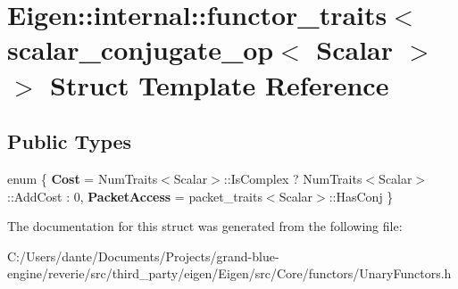 \hypertarget{struct_eigen_1_1internal_1_1functor__traits_3_01scalar__conjugate__op_3_01_scalar_01_4_01_4}{}\section{Eigen\+::internal\+::functor\+\_\+traits$<$ scalar\+\_\+conjugate\+\_\+op$<$ Scalar $>$ $>$ Struct Template Reference}
\label{struct_eigen_1_1internal_1_1functor__traits_3_01scalar__conjugate__op_3_01_scalar_01_4_01_4}
\subsection*{Public Types}
\begin{DoxyCompactItemize}
\item 
\mbox{\label{struct_eigen_1_1internal_1_1functor__traits_3_01scalar__conjugate__op_3_01_scalar_01_4_01_4_a6907bac3e09a9f8a0b7e7629fdd47185}} 
enum \{ {\bfseries Cost} = Num\+Traits$<$Scalar$>$\+::Is\+Complex ? Num\+Traits$<$Scalar$>$\+::Add\+Cost \+: 0, 
{\bfseries Packet\+Access} = packet\+\_\+traits$<$Scalar$>$\+::Has\+Conj
 \}
\end{DoxyCompactItemize}


The documentation for this struct was generated from the following file\+:\begin{DoxyCompactItemize}
\item 
C\+:/\+Users/dante/\+Documents/\+Projects/grand-\/blue-\/engine/reverie/src/third\+\_\+party/eigen/\+Eigen/src/\+Core/functors/Unary\+Functors.\+h\end{DoxyCompactItemize}
